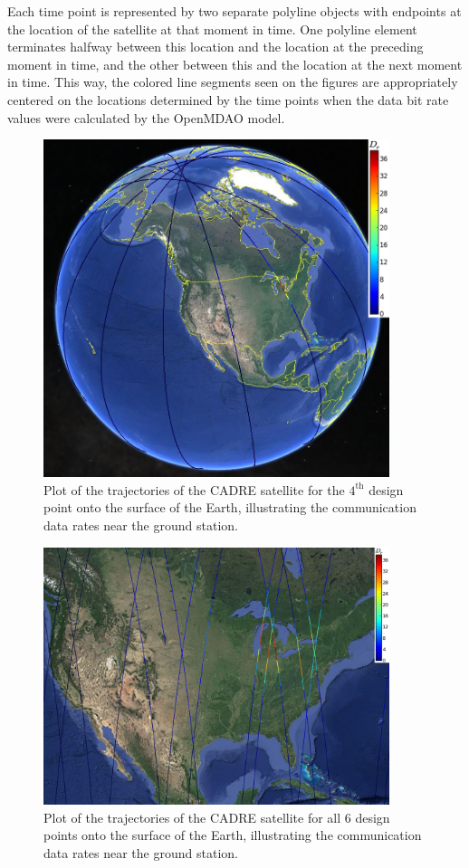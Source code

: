 \documentclass[]{aiaa-tc} %
\begin{document}
Each time point is represented by two separate polyline objects with endpoints
at the location of the satellite at that moment in time. One polyline element terminates
halfway between this location and the location at the preceding moment in time,
and the other between this and the location at the next moment in time. This way,
the colored line segments seen on the figures are appropriately centered on the
locations determined by the time points when the data bit rate values were calculated
by the OpenMDAO model.


\begin{figure}
\centering
\includegraphics[width=0.9\textwidth]{images/pt3_gearth3.png}
\caption[width=0.4\textwidth]{Plot of the trajectories of the CADRE satellite
for the $4^{\textrm{th}}$ design point onto the surface of the Earth, illustrating the
communication data rates near the ground station.}
\label{pt3_g_earth}
\end{figure}


\begin{figure}
\centering
\includegraphics[width=0.9\textwidth]{images/allpts_map_data.png}
\caption[width=0.4\textwidth]{Plot of the trajectories of the CADRE satellite
for all 6 design points onto the surface of the Earth, illustrating the
communication data rates near the ground station.}
\label{pt3_g_earth}
\end{figure}
\end{document}
